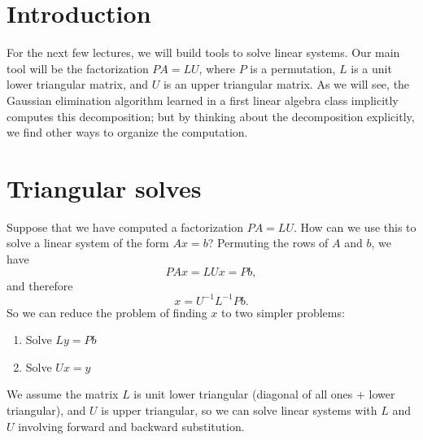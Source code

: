 \documentclass[12pt, leqno]{article}
\begin{document}

\section{Introduction}

For the next few lectures, we will build tools to solve linear
systems.  Our main tool will be the factorization $PA = LU$, where $P$
is a permutation, $L$ is a unit lower triangular matrix, and $U$ is an
upper triangular matrix.  As we will see, the Gaussian elimination
algorithm learned in a first linear algebra class implicitly computes
this decomposition; but by thinking about the decomposition
explicitly, we find other ways to organize the computation.

\section{Triangular solves}

Suppose that we have computed a factorization $PA = LU$.  How can we
use this to solve a linear system of the form $Ax = b$?  Permuting the
rows of $A$ and $b$, we have
\[
  PAx = LUx = Pb,
\]
and therefore
\[
  x = U^{-1} L^{-1} Pb.
\]
So we can reduce the problem of finding $x$ to two simpler problems:
\begin{enumerate}
\item
  Solve $Ly = Pb$
\item
  Solve $Ux = y$
\end{enumerate}
We assume the matrix $L$ is unit lower triangular (diagonal of all
ones + lower triangular), and $U$ is upper triangular, so we can solve
linear systems with $L$ and $U$ involving forward and backward
substitution.
\end{document}
